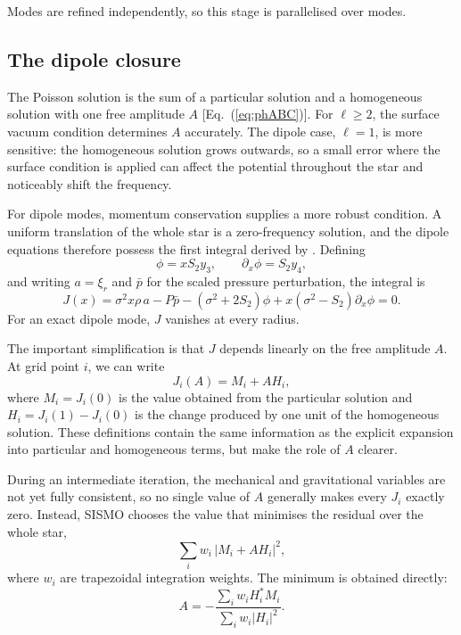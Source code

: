 \documentclass[]{aa}
\begin{document}
Modes are refined independently, so this stage is parallelised over modes.

\subsection{The dipole closure}
\label{subsec_dipole_closure}

The Poisson solution is the sum of a particular solution and a homogeneous solution with one free amplitude $A$ [Eq.~(\ref{eq:phABC})]. For $\ell\geq2$, the surface vacuum condition determines $A$ accurately. The dipole case, $\ell=1$, is more sensitive: the homogeneous solution grows outwards, so a small error where the surface condition is applied can affect the potential throughout the star and noticeably shift the frequency.

For dipole modes, momentum conservation supplies a more robust condition. A uniform translation of the whole star is a zero-frequency solution, and the dipole equations therefore possess the first integral derived by \citet{takata2005,takata2006}. Defining
\begin{equation}
\phi=xS_2y_3,
\qquad
\partial_x\phi=S_2y_4,
\end{equation}
and writing $a=\xi_r$ and $\bar p$ for the scaled pressure perturbation, the integral is
\begin{equation}
J(x)
=
\sigma^2x\rho\,a
-P\bar p
-(\sigma^2+2S_2)\phi
+x(\sigma^2-S_2)\partial_x\phi
=0 .
\label{eq:takata}
\end{equation}
For an exact dipole mode, $J$ vanishes at every radius.

The important simplification is that $J$ depends linearly on the free amplitude $A$. At grid point $i$, we can write
\begin{equation}
J_i(A)=M_i+A H_i,
\end{equation}
where $M_i=J_i(0)$ is the value obtained from the particular solution and $H_i=J_i(1)-J_i(0)$ is the change produced by one unit of the homogeneous solution. These definitions contain the same information as the explicit expansion into particular and homogeneous terms, but make the role of $A$ clearer.

During an intermediate iteration, the mechanical and gravitational variables are not yet fully consistent, so no single value of $A$ generally makes every $J_i$ exactly zero. Instead, SISMO chooses the value that minimises the residual over the whole star,
\begin{equation}
\sum_i w_i\,|M_i+A H_i|^2,
\end{equation}
where $w_i$ are trapezoidal integration weights. The minimum is obtained directly:
\begin{equation}
A
=
-\frac{\displaystyle\sum_i w_i H_i^{*}M_i}
       {\displaystyle\sum_i w_i |H_i|^2}.
\label{eq:closure}
\end{equation}
\end{document}
